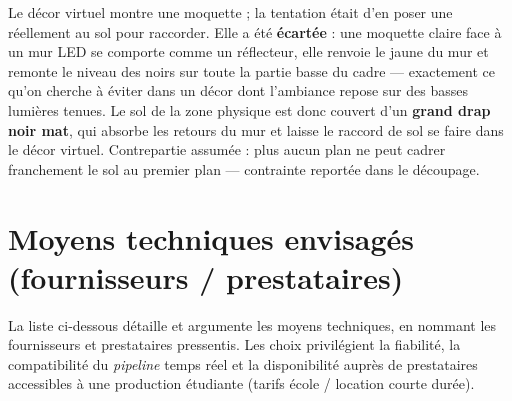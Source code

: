 \documentclass[11pt,a4paper]{report}
\begin{document}
\begin{notebox}[title={Traitement du sol --- drap noir plutôt que moquette}]
Le décor virtuel montre une moquette ; la tentation était d'en poser une réellement au sol pour raccorder. Elle a été \textbf{écartée} : une moquette claire face à un mur LED se comporte comme un réflecteur, elle renvoie le jaune du mur et remonte le niveau des noirs sur toute la partie basse du cadre --- exactement ce qu'on cherche à éviter dans un décor dont l'ambiance repose sur des basses lumières tenues. Le sol de la zone physique est donc couvert d'un \textbf{grand drap noir mat}, qui absorbe les retours du mur et laisse le raccord de sol se faire dans le décor virtuel. Contrepartie assumée : plus aucun plan ne peut cadrer franchement le sol au premier plan --- contrainte reportée dans le découpage.
\end{notebox}

\section{Moyens techniques envisagés (fournisseurs / prestataires)}
La liste ci-dessous détaille et argumente les moyens techniques, en nommant les fournisseurs et prestataires pressentis. Les choix privilégient la fiabilité, la compatibilité du \emph{pipeline} temps réel et la disponibilité auprès de prestataires accessibles à une production étudiante (tarifs école / location courte durée).
\end{document}
